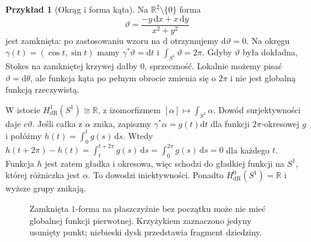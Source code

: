 \documentclass[11pt,a4paper,oneside]{report}
\newcommand{\R}{\mathbb{R}}
\newcommand{\dd}{\mathrm d}
\theoremstyle{plain}
\theoremstyle{definition}
\newtheorem{przyklad}[twierdzenie]{Przykład}
\theoremstyle{remark}
\begin{document}
\begin{przyklad}[Okrąg i forma kąta]
\label{prz:de-rham-s1}
Na $\R^2\setminus\{0\}$ forma
\[
 \vartheta=\frac{-y\,\dd x+x\,\dd y}{x^2+y^2}
\]
jest zamknięta: po zastosowaniu wzoru na $\dd$
otrzymujemy $\dd\vartheta=0$. Na okręgu
$\gamma(t)=(\cos t,\sin t)$ mamy
$\gamma^*\vartheta=\dd t$ i
$\int_{S^1}\vartheta=2\pi$. Gdyby $\vartheta$
była dokładna, Stokes na zamkniętej krzywej
dałby $0$, sprzeczność. Lokalnie możemy
pisać $\vartheta=\dd\theta$, ale funkcja kąta
po pełnym obrocie zmienia się o $2\pi$ i nie
jest globalną funkcją rzeczywistą.

W istocie $H^1_{\mathrm{dR}}(S^1)\cong\R$,
z izomorfizmem $[\alpha]\mapsto\int_{S^1}\alpha$.
Dowód surjektywności daje $c\vartheta$.
Jeśli całka z $\alpha$ znika, zapiszmy
$\gamma^*\alpha=g(t)\dd t$ dla funkcji
$2\pi$-okresowej $g$ i połóżmy
$h(t)=\int_0^t g(s)\,\dd s$. Wtedy
$h(t+2\pi)-h(t)=\int_t^{t+2\pi}g(s)\,\dd s
=\int_0^{2\pi}g(s)\,\dd s=0$ dla każdego $t$.
Funkcja $h$ jest zatem gładka i okresowa, więc schodzi
do gładkiej funkcji na $S^1$, której różniczka jest $\alpha$.
To dowodzi iniektywności. Ponadto
$H^0_{\mathrm{dR}}(S^1)=\R$ i wyższe grupy znikają.
\end{przyklad}

\begin{figure}[!htbp]
\centering
{}
\caption{Zamknięta $1$-forma na płaszczyźnie bez początku
może nie mieć globalnej funkcji pierwotnej.
Krzyżykiem zaznaczono jedyny usunięty punkt; niebieski
dysk przedstawia fragment dziedziny.}
\label{fig:de-rham-kat}
\end{figure}
\end{document}
